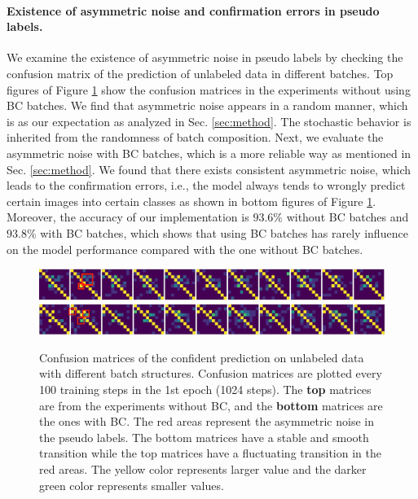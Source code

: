 \paragraph{Existence of asymmetric noise and confirmation errors in pseudo labels.} We examine the existence of asymmetric noise in pseudo labels by checking the confusion matrix of the prediction of unlabeled data in different batches. Top figures of Figure \ref{fig:cfmx} show the confusion matrices in the experiments without using BC batches. We find that asymmetric noise appears in a random manner, which is as our expectation as analyzed in Sec. \ref{sec:method}. The stochastic behavior is inherited from the randomness of batch composition. Next, we evaluate the asymmetric noise with BC batches, which is a more reliable way as mentioned in Sec. \ref{sec:method}. We found that there exists consistent asymmetric noise, which leads to the confirmation errors, i.e., the model always tends to wrongly predict certain images into certain classes as shown in bottom figures of Figure \ref{fig:cfmx}.
Moreover, the accuracy of our implementation is $93.6\%$ without BC batches and $93.8\%$ with BC batches, which shows that using BC batches has rarely influence on the model performance compared with the one without BC batches.

\begin{figure}[h]
\centering
\includegraphics[width=14cm]{../openreview/fig/uBC.png}\\
\includegraphics[width=14cm]{../openreview/fig/BC.png}
\caption{Confusion matrices of the confident prediction on unlabeled data with different batch structures.
Confusion matrices are plotted every 100 training steps in the 1st epoch (1024 steps).
The \textbf{top} matrices are from the experiments without BC, and the \textbf{bottom} matrices are the ones with BC. The red areas represent the asymmetric noise in the pseudo labels. The bottom matrices have a stable and smooth transition while the top matrices have a fluctuating transition in the red areas. The yellow color represents larger value and the darker green color represents smaller values.
}\label{fig:cfmx}
\end{figure}


